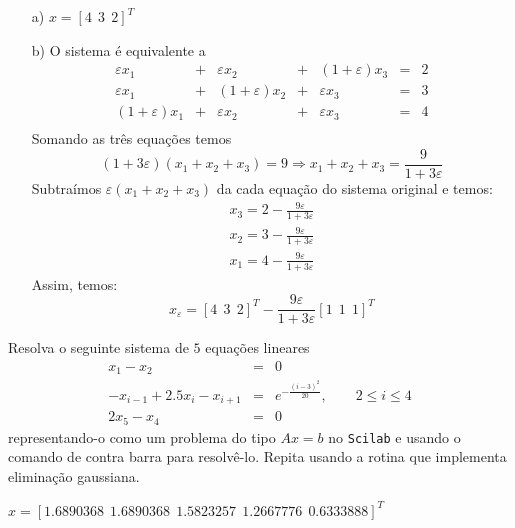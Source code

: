 \begin{resp}

\begin{itemize}
\item[a)] $x=[4 ~~3 ~~2]^T$

\item[b)] O sistema é equivalente a
\begin{equation}
\begin{array}{lclclcl}
\varepsilon x_1 &+& \varepsilon x_2 &+&(1+\varepsilon) x_3 &=& 2\\
\varepsilon x_1 &+& (1+\varepsilon) x_2 &+&\varepsilon x_3 &=& 3\\
(1+\varepsilon) x_1 &+& \varepsilon x_2 &+&\varepsilon x_3 &=& 4\\
\end{array}
\end{equation}
Somando as três equações temos
\begin{equation} (1+3\varepsilon)(x_1+x_2+x_3)=9\Longrightarrow x_1+x_2+x_3=\frac{9}{1+3\varepsilon} \end{equation}
Subtraímos $\varepsilon(x_1+x_2+x_3)$ da cada equação do sistema original e temos:
\begin{equation}\begin{array}{l}
x_3=2-\frac{9\varepsilon}{1+3\varepsilon}\\
x_2=3-\frac{9\varepsilon}{1+3\varepsilon}\\
x_1=4-\frac{9\varepsilon}{1+3\varepsilon}
\end{array}
\end{equation}
Assim, temos:
\begin{equation} x_{\varepsilon}=\left[4 ~~3 ~~2\right]^T-\frac{9\varepsilon}{1+3\varepsilon}\left[1 ~~1 ~~1\right]^T \end{equation}
\end{itemize}

\end{resp}
\fi

\ifisscilab
\begin{exer}\label{exer:trid} Resolva o seguinte sistema de $5$ equações lineares
\begin{eqnarray}
x_1-x_2&=&0\\
-x_{i-1}+2.5x_i-x_{i+1}&=&e^{-\frac{(i-3)^2}{20}},\qquad 2\leq i \leq 4\\
2x_{5}-x_{4}&=&0
\end{eqnarray}
representando-o como um problema do tipo $Ax=b$ no \verb+Scilab+ e usando o comando de contra barra para resolvê-lo. Repita usando a rotina que implementa eliminação gaussiana.
\end{exer}
\begin{resp}
 $x=[ 1.6890368  ~~  1.6890368  ~~  1.5823257  ~~  1.2667776   ~~ 0.6333888]^{T}$
\end{resp}
\fi

